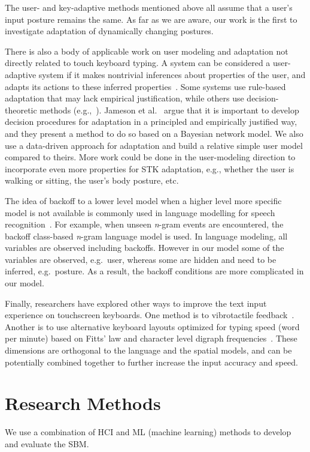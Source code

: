 \documentclass{sigchi}
\begin{document}
The user- and key-adaptive methods mentioned above all assume that a user's input posture
remains the same. As far as we are aware, our work is the first to investigate adaptation of dynamically changing postures.

There is also a body of applicable work on user modeling and adaptation not
directly related to touch keyboard typing. A system can be considered a
user-adaptive system if it makes
nontrivial inferences about properties of the user, and adapts its actions
to these inferred properties~\cite{Jameson:2000}. Some systems use rule-based
adaptation that may lack empirical justification, while others use
decision-theoretic methods (e.g.,~\cite{Jameson:1998}). Jameson et al.~\cite{Jameson:2000} argue that it is important to develop decision procedures for adaptation in a principled and
empirically justified way, and they present a method to do so based on a
Bayesian network model. We also use a data-driven approach for adaptation and build a relative simple user model compared to theirs. More work could be done in the
user-modeling direction to incorporate even more properties for
STK adaptation, e.g., whether the user is walking or sitting, the user's body
posture, etc.

The idea of backoff to a lower level model when a higher level more specific
model is not available is commonly used in language modelling for speech
recognition~\cite{Katz:1987, Zitouni:2007}. For example, when unseen
\textit{n}\mbox{-}gram events are encountered, the backoff class-based \textit{n}\mbox{-}gram
language model is used.  In language modeling, all variables are observed including backoffs.
However in our model some of the variables are observed, e.g.\ user, whereas some
are hidden and need to be inferred, e.g.\ posture. As a result, the backoff
conditions are more complicated in our model.

Finally, researchers have explored other ways to improve the
text input experience on touchscreen keyboards. One method is to vibrotactile feedback~\cite{Brewster:2007, Hoggan:2008}.
Another is to use alternative keyboard layouts optimized for typing speed (word per minute)
based on Fitts' law and character level digraph frequencies~\cite{Zhai:2000, MacKenzie:1999}.
These dimensions are orthogonal to the language and the spatial models, and can be potentially
combined together to further increase the input accuracy and speed.

\section{Research Methods}
We use a combination of HCI and ML (machine learning) methods to develop and evaluate the SBM.
\end{document}
